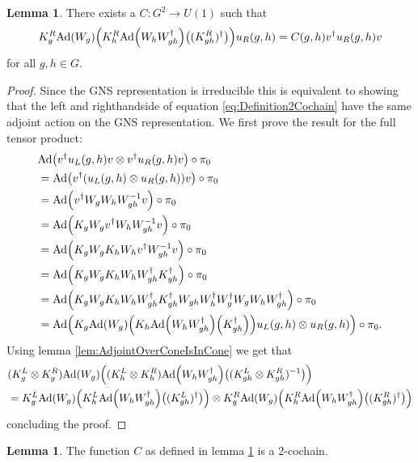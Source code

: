 \documentclass[12pt,a4paper,twoside]{article}
\let\originalleft\left
\let\originalright\right
\renewcommand{\left}{\mathopen{}\mathclose\bgroup\originalleft}
\renewcommand{\right}{\aftergroup\egroup\originalright}
\newcommand{\Ad}[1]{\textrm{Ad}\left(#1\right)}
\theoremstyle{definition}
\newtheorem{lemma}[theorem]{Lemma}
\numberwithin{equation}{section}
\begin{document}
\begin{lemma}\label{lem:Definition2Cochain}
	There exists a $C:G^2\rightarrow U(1)$ such that 
	\begin{equation}\label{eq:Definition2Cochain}
		K_g^R\Ad{W_g}\left(K_h^R\Ad{W_hW_{gh}^\dagger}\left((K_{gh}^R)^\dagger\right)\right)u_
		R(g,h)=C(g,h)v^\dagger u_R(g,h)v
	\end{equation}
	for all $g,h\in G.$
\end{lemma}
\begin{proof}
	Since the GNS representation is irreducible this is equivalent to showing that the left and righthandside of equation \eqref{eq:Definition2Cochain} have the same adjoint action on the GNS representation. We first prove the result for the full tensor product:
	\begin{align}
		&\Ad{v^\dagger u_L(g,h)v\otimes v^\dagger u_R(g,h) v}\circ\pi_0\\
		&=\Ad{v^\dagger (u_L(g,h)\otimes u_R(g,h)) v}\circ\pi_0\\
		&=\Ad{v^\dagger W_g W_h W_{gh}^{-1}v}\circ\pi_0\\
		&=\Ad{K_gW_g v^\dagger W_h W_{gh}^{-1}v}\circ\pi_0\\
		&=\Ad{K_gW_g K_h W_h v^\dagger W_{gh}^{-1}v}\circ\pi_0\\
		&=\Ad{K_gW_g K_h W_h W_{gh}^\dagger K_{gh}^\dagger }\circ\pi_0\\
		&=\Ad{K_gW_g K_h W_h W_{gh}^\dagger K_{gh}^\dagger W_{gh}W_h^\dagger W_g^\dagger W_gW_hW_{gh}^\dagger}\circ\pi_0\\
		&=\Ad{K_g\Ad{W_g}\left(K_h\Ad{W_hW_{gh}^\dagger}\left(K_{gh}^\dagger\right)\right)u_L(g,h)\otimes u_
			R(g,h)}\circ\pi_0.
	\end{align}
	Using lemma \ref{lem:AdjointOverConeIsInCone} we get that
	\begin{align}
		&(K_g^L\otimes K_g^R)\Ad{W_g}\left((K_h^L\otimes K_h^R)\Ad{W_hW_{gh}^\dagger}\left((K_{gh}^L\otimes K_{gh}^R)^{-1}\right)\right)\\
		&=K_g^L\Ad{W_g}\left(K_h^L\Ad{W_hW_{gh}^\dagger}\left((K_{gh}^L)^\dagger\right)\right)\otimes K_g^R\Ad{W_g}\left(K_h^R\Ad{W_hW_{gh}^\dagger}\left((K_{gh}^R)^\dagger\right)\right)
	\end{align}
	concluding the proof.
\end{proof}
\begin{lemma}
	The function $C$ as defined in lemma \ref{lem:Definition2Cochain} is a 2-cochain.
\end{lemma}
\end{document}
